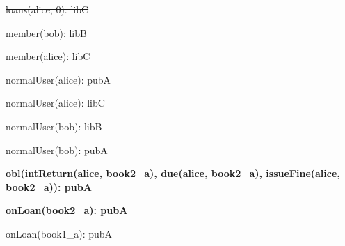 \documentclass{article}
\begin{document}
{\begin{minipage}{\tableWidth}
\begin{description}[align=left,leftmargin=1em,noitemsep,labelsep=\parindent]
\item{\sout{loans(\allowbreak{}alice, 0): libC}}
\item{{member(\allowbreak{}bob): libB}}
\item{{member(\allowbreak{}alice): libC}}
\item{{normalUser(\allowbreak{}alice): pubA}}
\item{{normalUser(\allowbreak{}alice): libC}}
\item{{normalUser(\allowbreak{}bob): libB}}
\item{{normalUser(\allowbreak{}bob): pubA}}
\item\textbf{{obl(\allowbreak{}intReturn(\allowbreak{}alice, book2\_a), due(\allowbreak{}alice, book2\_a), issueFine(\allowbreak{}alice, book2\_a)): pubA}}
\item\textbf{{onLoan(\allowbreak{}book2\_a): pubA}}
\item{{onLoan(\allowbreak{}book1\_a): pubA}}
\end{description}\end{minipage}}
\end{document}
